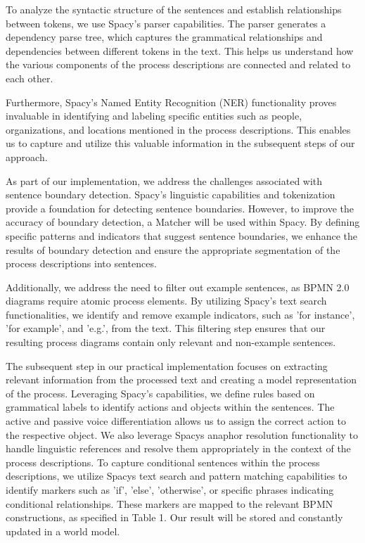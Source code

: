 To analyze the syntactic structure of the sentences and establish relationships between tokens, we use Spacy's parser capabilities. The parser generates a dependency parse tree, which captures the grammatical relationships and dependencies between different tokens in the text. This helps us understand how the various components of the process descriptions are connected and related to each other.

Furthermore, Spacy's Named Entity Recognition (NER) functionality proves invaluable in identifying and labeling specific entities such as people, organizations, and locations mentioned in the process descriptions. This enables us to capture and utilize this valuable information in the subsequent steps of our approach.

As part of our implementation, we address the challenges associated with sentence boundary detection. Spacy's linguistic capabilities and tokenization provide a foundation for detecting sentence boundaries. However, to improve the accuracy of boundary detection, a Matcher will be used within Spacy. By defining specific patterns and indicators that suggest sentence boundaries, we enhance the results of boundary detection and ensure the appropriate segmentation of the process descriptions into sentences.

Additionally, we address the need to filter out example sentences, as BPMN 2.0 diagrams require atomic process elements. By utilizing Spacy's text search functionalities, we identify and remove example indicators, such as 'for instance', 'for example', and 'e.g.', from the text. This filtering step ensures that our resulting process diagrams contain only relevant and non-example sentences.
 
The subsequent step in our practical implementation focuses on extracting relevant information from the processed text and creating a model representation of the process. Leveraging Spacy's capabilities, we define rules based on grammatical labels to identify actions and objects within the sentences. The active and passive voice differentiation allows us to assign the correct action to the respective object. We also leverage Spacys anaphor resolution functionality to handle linguistic references and resolve them appropriately in the context of the process descriptions.
To capture conditional sentences within the process descriptions, we utilize Spacys text search and pattern matching capabilities to identify markers such as 'if', 'else', 'otherwise', or specific phrases indicating conditional relationships. These markers are mapped to the relevant BPMN constructions, as specified in Table 1. Our result will be stored and constantly updated in a world model. 

